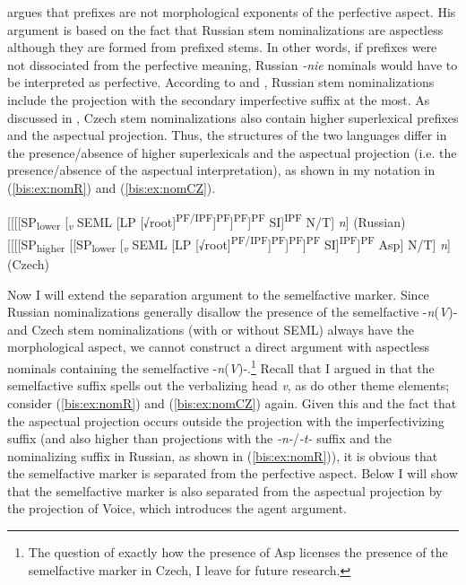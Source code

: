 \documentclass[output=paper]{langscibook}
\begin{document}
\citet{Tatevosov2011} argues that prefixes are not morphological exponents of the perfective aspect. His argument is based on the fact that Russian stem nominalizations are aspectless although they are formed from prefixed stems. In other words, if prefixes were not dissociated from the perfective meaning, Russian \textit{-nie} nominals would have to be interpreted as perfective. According to \citet{Pazelskaya.Tatevosov2008} and \citet{Tatevosov2011}, Russian stem nominalizations include the projection with the secondary imperfective suffix at the most. As discussed in , Czech stem nominalizations also contain higher superlexical prefixes and the aspectual projection. Thus, the structures of the two languages differ in the presence/absence of higher superlexicals and the aspectual projection (i.e. the presence/absence of the aspectual interpretation), as shown in my notation in (\ref{bis:ex:nomR}) and (\ref{bis:ex:nomCZ}).

\ea\label{bis:ex:nomR}	
[[[[SP\textsubscript{lower} [\textsubscript{\textit{v}} SEML [LP [√root]\textsuperscript{PF/IPF}]\textsuperscript{PF}]\textsuperscript{PF}]\textsuperscript{PF} SI]\textsuperscript{IPF} N/T] \textit{n}]
\hfill (Russian)
\z
\ea\label{bis:ex:nomCZ}	
[[[[SP\textsubscript{higher} [[SP\textsubscript{lower} [\textsubscript{\textit{v}} SEML [LP [√root]\textsuperscript{PF/IPF}]\textsuperscript{PF}]\textsuperscript{PF}]\textsuperscript{PF} SI]\textsuperscript{IPF}]\textsuperscript{PF} Asp] N/T] \textit{n}]
\hfill (Czech)
\z

\noindent Now I will extend the separation argument to the semelfactive marker. Since Russian nominalizations generally disallow the presence of the semelfactive -\textit{n}(\textit{V})- and Czech stem nominalizations (with or without SEML) always have the morphological aspect, we cannot construct a direct argument with aspectless nominals containing the semelfactive -\textit{n}(\textit{V})-.\footnote{The question of exactly how the presence of Asp licenses the presence of the semelfactive marker in Czech, I leave for future research.} Recall that I argued in  that the semelfactive suffix spells out the verbalizing head \textit{v}, as do other theme elements; consider (\ref{bis:ex:nomR}) and (\ref{bis:ex:nomCZ}) again. Given this and the fact that the aspectual projection occurs outside the projection with the imperfectivizing suffix (and also higher than projections with the \textit{-n-}/\textit{-t-} suffix and the nominalizing suffix in Russian, as shown in (\ref{bis:ex:nomR})), it is obvious that the semelfactive marker is separated from the perfective aspect. Below I will show that the semelfactive marker is also separated from the aspectual projection by the projection of Voice, which introduces the agent argument.
\end{document}
